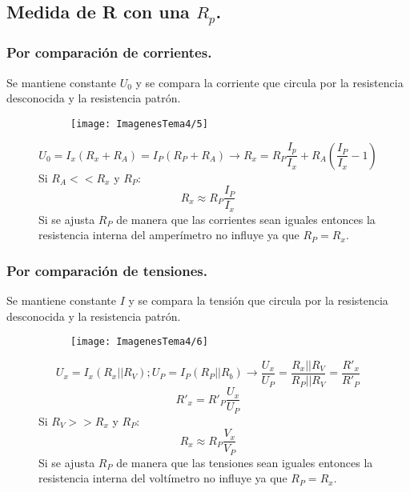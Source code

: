 \subsection{Medida de R con una $R_p$.}
\subsubsection{Por comparación de corrientes.}
Se mantiene constante $U_0$ y se compara la corriente que circula por la resistencia desconocida y la resistencia patrón.
\begin{figure}[H]
	\begin{minipage}{0.5\textwidth}
		\begin{figure}[H]
			\centering
			\texttt{[image: ImagenesTema4/5]}
			\label{fig:5}
		\end{figure}
	\end{minipage}
	\begin{minipage}{0.5\textwidth}
	\[U_0=I_x(R_x+R_A)=I_P(R_P+R_A)\rightarrow R_x=R_P\frac{I_p}{I_x}+R_A\left(\frac{I_P}{I_x}-1\right)\]
	Si $R_A <<R_x$ y $R_P$:
	\[R_x\approx R_P\frac{I_P}{I_x}\]
	Si se ajusta $R_P$ de manera que las corrientes sean iguales entonces la resistencia interna del amperímetro no influye ya que $R_P=R_x$.
	\end{minipage}
\end{figure}



\subsubsection{Por comparación de tensiones.}
Se mantiene constante $I$ y se compara la tensión que circula por la resistencia desconocida y la resistencia patrón.
\begin{figure}[H]
	\begin{minipage}{0.5\textwidth}
		\begin{figure}[H]
			\centering
			\label{fig:6}
			\texttt{[image: ImagenesTema4/6]}
		\end{figure}
	\end{minipage}
	\begin{minipage}{0.5\textwidth}
		\[U_x=I_x(R_x||R_V); U_P=I_P(R_P||R_b)\rightarrow \frac{U_x}{U_P}=\frac{R_x||R_V}{R_P||R_V}=\frac{R'_x}{R'_P}\]
		\[R'_x=R'_P\frac{U_x}{U_P}\]
		Si $R_V >>R_x$ y $R_P$:
		\[R_x\approx R_P\frac{V_x}{V_P}\]
		Si se ajusta $R_P$ de manera que las tensiones sean iguales entonces la resistencia interna del voltímetro no influye ya que $R_P=R_x$.
	\end{minipage}
\end{figure}
